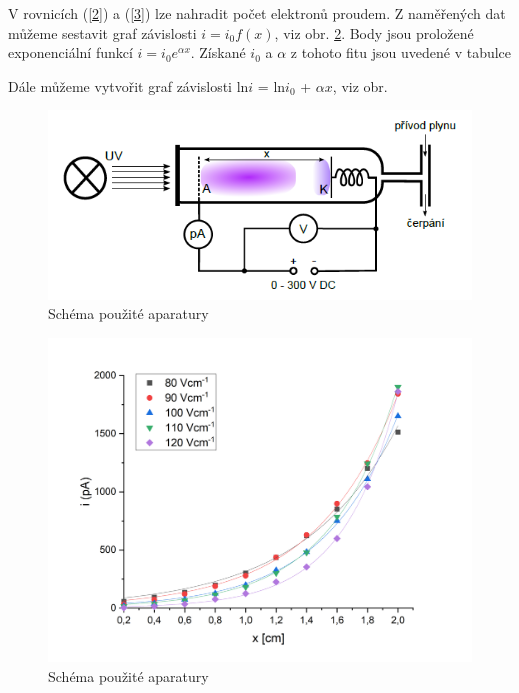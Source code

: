 \documentclass[a4paper,12pt]{article}
\begin{document}
V rovnicích (\ref{2}) a (\ref{3}) lze nahradit počet elektronů proudem. Z naměřených dat můžeme sestavit graf závislosti $i = i_0 f(x)$, viz obr. \ref{ifx}. Body jsou proložené exponenciální funkcí $i = i_0 e^{\alpha x}$. Získané $i_0$ a $\alpha$ z tohoto fitu jsou uvedené v tabulce %

Dále můžeme vytvořit graf závislosti ln$i$ = ln$i_0$ + $\alpha x$, viz obr. 



\begin{figure}[h]
	\centering
	\includegraphics[width=130mm]{aparatura.png}
	\caption{Schéma použité aparatury}
	\label{aparatura}
\end{figure}

\begin{figure}[h]
	\centering
	\includegraphics[width=130mm]{ifx.png}
	\caption{Schéma použité aparatury}
	\label{ifx}
\end{figure}
\end{document}
